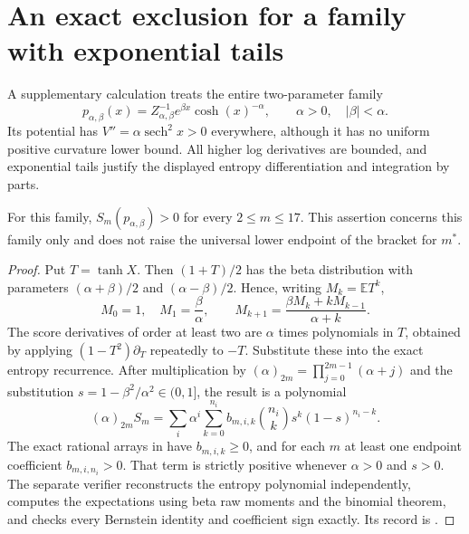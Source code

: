 \section{An exact exclusion for a family with exponential tails}
A supplementary calculation treats the entire two-parameter family
\[
 p_{\alpha,\beta}(x)=Z_{\alpha,\beta}^{-1}
 e^{\beta x}\cosh(x)^{-\alpha},\qquad \alpha>0,\quad |\beta|<\alpha.
\]
Its potential has $V''=\alpha\operatorname{sech}^2x>0$ everywhere,
although it has no uniform positive curvature lower bound. All higher
log derivatives are bounded, and exponential tails justify the displayed
entropy differentiation and integration by parts.
\begin{proposition}
For this family, $S_m(p_{\alpha,\beta})>0$ for every $2\le m\le17$.
This assertion concerns this family only and does not raise the universal
lower endpoint of the bracket for $m^*$.
\end{proposition}
\begin{proof}
Put $T=\tanh X$. Then $(1+T)/2$ has the beta distribution with parameters
$(\alpha+\beta)/2$ and $(\alpha-\beta)/2$. Hence, writing $M_k=\mathbb E T^k$,
\[
 M_0=1,\quad M_1=\frac\beta\alpha,\qquad
 M_{k+1}=\frac{\beta M_k+kM_{k-1}}{\alpha+k}.
\]
The score derivatives of order at least two are $\alpha$ times polynomials
in $T$, obtained by applying $(1-T^2)\partial_T$ repeatedly to $-T$.
Substitute these into the exact entropy recurrence. After multiplication
by $(\alpha)_{2m}=\prod_{j=0}^{2m-1}(\alpha+j)$ and the substitution
$s=1-\beta^2/\alpha^2\in(0,1]$, the result is a polynomial
\[
 (\alpha)_{2m}S_m
 =\sum_i\alpha^i\sum_{k=0}^{n_i}
 b_{m,i,k}\binom{n_i}{k}s^k(1-s)^{n_i-k}.
\]
The exact rational arrays in
 have $b_{m,i,k}\ge0$,
and for each $m$ at least one endpoint coefficient $b_{m,i,n_i}>0$.
That term is strictly positive whenever $\alpha>0$ and $s>0$.
The separate verifier reconstructs the entropy polynomial independently,
computes the expectations using beta raw moments and the binomial theorem,
and checks every Bernstein identity and coefficient sign exactly.
Its record is .
\end{proof}
